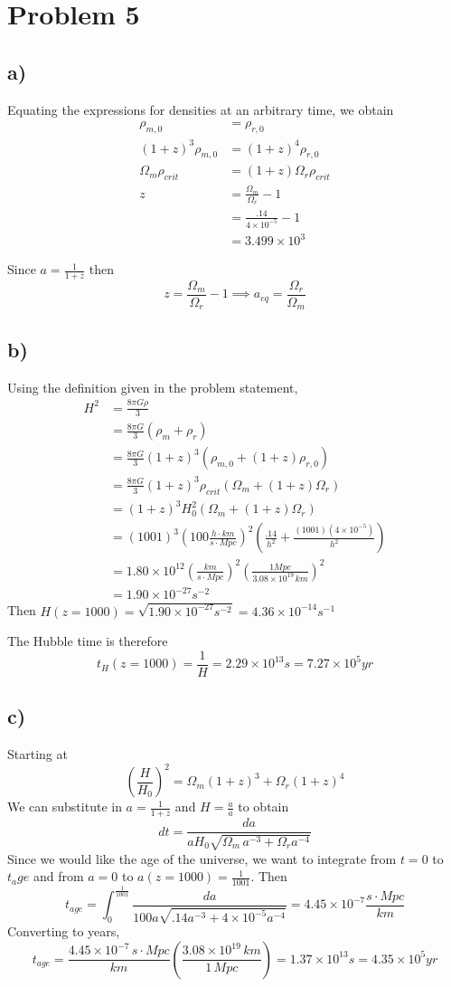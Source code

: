 \documentclass{article}
\begin{document}
\section*{Problem 5}
\subsection*{a)}
Equating the expressions for densities at an arbitrary time, we obtain
\begin{align*}
\rho_{m,0} &= \rho_{r,0}\\
(1+z)^3\rho_{m,0} &= (1+z)^4\rho_{r,0}\\
\Omega_m\rho_{crit} &= (1+z)\Omega_r \rho_{crit}\\
z&=\frac{\Omega_m}{\Omega_r}-1\\
&= \frac{.14}{4\times 10^{-5}}-1\\
&= 3.499\times 10^{3}
\end{align*}

Since $a=\frac{1}{1+z}$ then
\[z=\frac{\Omega_m}{\Omega_r}-1\implies a_{eq}=\frac{\Omega_r}{\Omega_m}\]
\subsection*{b)}
Using the definition given in the problem statement,
\begin{align*}
H^2 &= \frac{8\pi G \rho}{3}\\
&= \frac{8\pi G}{3}(\rho_m+\rho_r)\\
&= \frac{8\pi G}{3}(1+z)^3(\rho_{m,0}+(1+z)\rho_{r,0})\\
&= \frac{8\pi G}{3}(1+z)^3\rho_{crit}(\Omega_m+(1+z)\Omega_r)\\
&= (1+z)^3 H_0^2(\Omega_m+(1+z)\Omega_r)\\
&= (1001)^3\left(100\frac{h\cdot km}{s\cdot Mpc}\right)^2\left(\frac{.14}{h^2}+\frac{(1001)(4\times 10^{-5})}{h^2}\right)\\
&= 1.80\times 10^{12}(\frac{km}{s\cdot Mpc})^2(\frac{1 Mpc}{3.08\times 10^{19}\,km})^2\\
&=1.90\times 10^{-27}s^{-2}
\end{align*}
Then $H(z=1000) = \sqrt{1.90\times 10^{-27}s^{-2}} = 4.36\times 10^{-14} s^{-1}$

The Hubble time is therefore
\[t_H(z=1000) = \frac{1}{H} = 2.29\times 10^13 s = 7.27\times 10^{5}yr\]
\subsection*{c)}
Starting at
\[\left(\frac{H}{H_0}\right)^2 = \Omega_m(1+z)^3+\Omega_r(1+z)^4\]
We can substitute in $a=\frac{1}{1+z}$ and $H = \frac{\dot{a}}{a}$ to obtain
\[dt = \frac{da}{aH_0\sqrt{\Omega_m\,a^{-3}+\Omega_r a^{-4}}}\]
Since we would like the age of the universe, we want to integrate from $t=0$ to $t_age$ and from $a=0$ to $a(z=1000) = \frac{1}{1001}$. Then
\[t_{age} = \int_0^{\frac{1}{1001}}\frac{da}{100a\sqrt{.14a^{-3}+4\times 10^{-5}a^{-4}}} = 4.45\times 10^{-7} \frac{s\cdot Mpc}{km}\]
Converting to years,
\[t_{age} = \frac{4.45\times 10^{-7}\,s\cdot Mpc}{km}\left(\frac{3.08\times 10^19\,km}{1\,Mpc}\right) = 1.37\times 10^13 s = 4.35\times 10^5 yr\]
\end{document}
